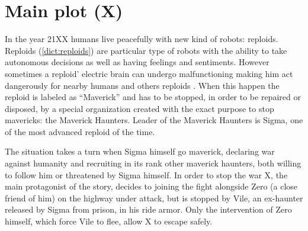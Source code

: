 \section[Main plot]{Main plot (X)}
In the year 21XX humans live peacefully with new kind of robots: reploids. Reploids (\ref{dict:reploids}) are particular type of robots with the ability to take autonomous decisions as well as having feelings and sentiments\cite{Xcoll1:Manual_X1}. However sometimes  a reploid' electric brain can undergo  malfunctioning making him act dangerously for nearby humans and others reploids . When this happen the reploid is labeled as ``Maverick'' and has to be stopped, in order to be repaired or disposed, by a special organization created with the exact purpose to stop mavericks: the Maverick Haunters. Leader of the Maverick Haunters is Sigma, one of the most advanced reploid of the time. 

The situation takes a turn when Sigma himself go maverick, declaring war against humanity and recruiting in its rank other maverick haunters, both willing to follow him or threatened by Sigma himself. In order to stop the war X, the main protagonist of the story, decides to joining the fight alongside Zero (a close friend of him) on the highway under attack, but is stopped by Vile, an ex-haunter released by Sigma from prison, in his ride armor. Only the intervention of Zero himself, which force Vile to flee, allow X to escape safely.

